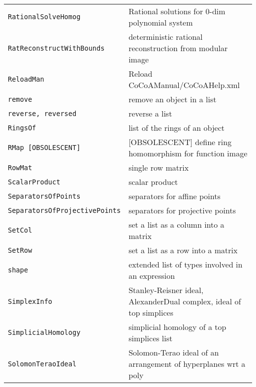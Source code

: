 \documentclass[a4paper]{mybook}
\begin{document}
\begin{center}
\begin{longtable}{ll}
{\verb~RationalSolveHomog~} &
      Rational solutions for 0-dim polynomial system\\
   
{\verb~RatReconstructWithBounds~} &
      deterministic rational reconstruction from modular image\\
   
{\verb~ReloadMan~} &
      Reload CoCoAManual/CoCoAHelp.xml\\
   
{\verb~remove~} &
      remove an object in a list\\
   
{\verb~reverse, reversed~} &
      reverse a list\\
   
{\verb~RingsOf~} &
      list of the rings of an object\\
   
{\verb~RMap [OBSOLESCENT]~} &
      [OBSOLESCENT] define ring homomorphism for function image\\
   
{\verb~RowMat~} &
      single row matrix\\
   
{\verb~ScalarProduct~} &
      scalar product\\
   
{\verb~SeparatorsOfPoints~} &
      separators for affine points\\
   
{\verb~SeparatorsOfProjectivePoints~} &
      separators for projective points\\
   
{\verb~SetCol~} &
      set a list as a column into a matrix\\
   
{\verb~SetRow~} &
      set a list as a row into a matrix\\
   
{\verb~shape~} &
      extended list of types involved in an expression\\
   
{\verb~SimplexInfo~} &
      Stanley-Reisner ideal, AlexanderDual complex, ideal of top simplices\\
   
{\verb~SimplicialHomology~} &
      simplicial homology of a top simplices list\\
   
{\verb~SolomonTeraoIdeal~} &
      Solomon-Terao ideal of an arrangement of hyperplanes wrt a poly\\
   

\end{longtable}
\end{center}
\end{document}
